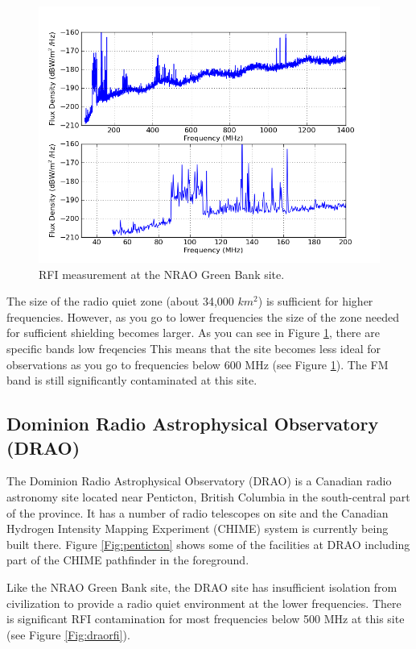 \begin{figure}[htb]
\begin{center}
\includegraphics[width=0.95\linewidth]{RFI_testing/figures/GBT_cal.png}
\caption{RFI measurement at the NRAO Green Bank site. }
\label{Fig:gbtrfi}
\end{center}
\end{figure}

The size of the radio quiet zone (about 34,000 $km^2$) is sufficient for higher frequencies. However, as you go to lower frequencies the size of the zone needed for sufficient shielding becomes larger. As you can see in Figure \ref{Fig:gbtrfi}, there are specific bands low freqencies This means that the site becomes less ideal for observations as you go to frequencies below 600 MHz (see Figure \ref{Fig:gbtrfi}). The FM band is still significantly contaminated at this site. 

\subsection{Dominion Radio Astrophysical Observatory (DRAO)}

The Dominion Radio Astrophysical Observatory (DRAO) is a Canadian radio astronomy site located near Penticton, British Columbia in the south-central part of the province. It has a number of radio telescopes on site and the Canadian Hydrogen Intensity Mapping Experiment (CHIME) system is currently being built there. Figure \ref{Fig:penticton} shows some of the facilities at DRAO including part of the CHIME pathfinder in the foreground. 

Like the NRAO Green Bank site, the DRAO site has insufficient isolation from civilization to provide a radio quiet environment at the lower frequencies. There is significant RFI contamination for most frequencies below 500 MHz at this site (see Figure \ref{Fig:draorfi}). 

